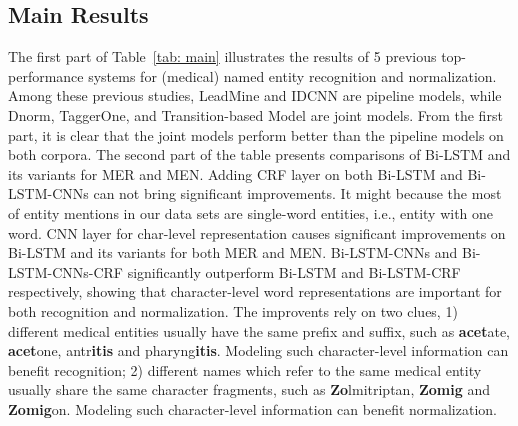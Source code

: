 \subsection{Main Results}
\label{sec: main}
The first part of Table~\ref{tab: main} illustrates the results of 5 previous top-performance systems for (medical) named entity recognition and normalization. 
Among these previous studies, LeadMine and IDCNN are pipeline models, while Dnorm, TaggerOne, and Transition-based Model are joint models.
From the first part, it is clear that the joint models perform better than the pipeline models on both corpora. 
The second part of the table presents comparisons of Bi-LSTM and its variants for MER and MEN. Adding CRF layer on both Bi-LSTM and Bi-LSTM-CNNs can not bring significant improvements. It might because the most of entity mentions in our data sets are single-word entities, i.e., entity with one word. CNN layer for char-level representation causes significant improvements on Bi-LSTM and its variants for both MER and MEN. 
Bi-LSTM-CNNs and Bi-LSTM-CNNs-CRF significantly outperform Bi-LSTM and Bi-LSTM-CRF respectively, showing that character-level word representations are important for both recognition and normalization. The improvents rely on two clues, 1) different medical entities usually have the same prefix and suffix, such as \textbf{acet}ate, \textbf{acet}one, antr\textbf{itis} and pharyng\textbf{itis}. Modeling such character-level information can benefit recognition; 2) different names which refer to the same medical entity usually share the same character fragments, such as \textbf{Zo}lmitriptan, \textbf{Zomig} and \textbf{Zomig}on. Modeling such character-level information can benefit normalization.
